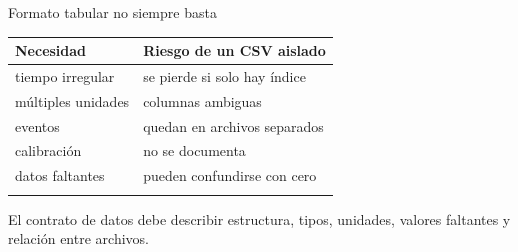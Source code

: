 \documentclass[
  ignorenonframetext,
  aspectratio=169,
  spanish,
]{beamer}
\newcounter{none} %
\begin{document}
\begin{frame}{Formato tabular no siempre basta}
  \protect{}\label{formato-tabular-no-siempre-basta}
  {\def\LTcaptype{none} %
    \begin{longtable}[]{@{}ll@{}}
      \toprule\noalign{}
      Necesidad          & Riesgo de un CSV aislado     \\
      \midrule\noalign{}
      \endhead
      tiempo irregular   & se pierde si solo hay índice \\
      múltiples unidades & columnas ambiguas            \\
      eventos            & quedan en archivos separados \\
      calibración        & no se documenta              \\
      datos faltantes    & pueden confundirse con cero  \\
      \bottomrule\noalign{}
    \end{longtable}
  }

  \begin{tcolorbox}[enhanced jigsaw, arc=.35mm, bottomrule=.15mm, bottomtitle=1mm, breakable, colback=white, colbacktitle=quarto-callout-tip-color!10!white, colframe=quarto-callout-tip-color-frame, coltitle=black, left=2mm, leftrule=.75mm, opacityback=0, opacitybacktitle=0.6, rightrule=.15mm, title=\textcolor{quarto-callout-tip-color}{\faLightbulb}\hspace{0.5em}{Tip}, titlerule=0mm, toprule=.15mm, toptitle=1mm]

    El contrato de datos debe describir estructura, tipos, unidades, valores
    faltantes y relación entre archivos.

  \end{tcolorbox}
\end{frame}
\end{document}
